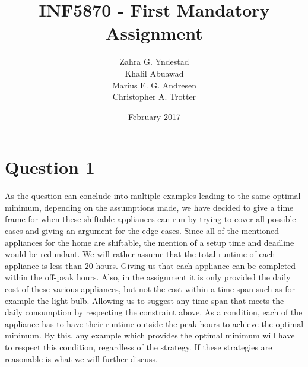 \documentclass{article}
\title{INF5870 - First Mandatory Assignment}
\author{Zahra G. Yndestad \\ Khalil Abuawad \\ Marius E. G. Andresen \\ Christopher A. Trotter}
\date{February 2017}
\begin{document}

\section{Question 1}
	As the question can conclude into multiple examples leading to the same optimal minimum, depending on the assumptions made, we have decided to give a time frame for when these shiftable appliances can run by trying to cover all possible cases and giving an argument for the edge cases. Since all of the mentioned appliances for the home are shiftable, the mention of a setup time and deadline would be redundant. We will rather assume that the total runtime of each appliance is less than 20 hours. Giving us that each appliance can be completed within the off-peak hours. Also, in the assignment it is only provided the daily cost of these various appliances, but not the cost within a time span such as for example the light bulb. Allowing us to suggest any time span that meets the daily consumption by respecting the constraint above.  As a condition, each of the appliance has to have their runtime outside the peak hours to achieve the optimal minimum. By this, any example which provides the optimal minimum will have to respect this condition, regardless of the strategy. If these strategies are reasonable is what we will further discuss.
\end{document}
